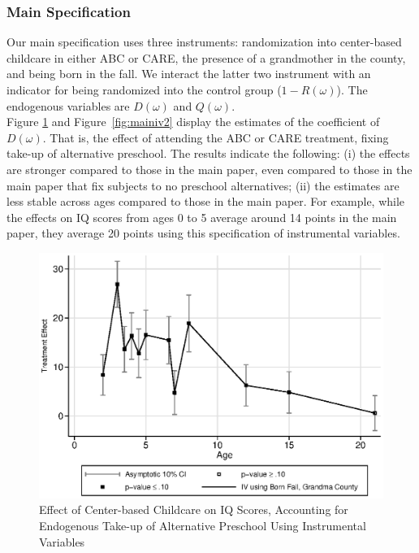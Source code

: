 \begin{appendices}
\subsubsection{Main Specification}

\noindent Our main specification uses three instruments: randomization into center-based childcare in either ABC or CARE, the presence of a grandmother in the county, and being born in the fall. We interact the latter two instrument with an indicator for being randomized into the control group ($1-R(\omega)$). The endogenous variables are $D(\omega)$ and $Q(\omega)$.\\

\noindent Figure \ref{fig:main_iv1} and Figure~\ref{fig:mainiv2} display the estimates of the coefficient of $D(\omega)$. That is, the effect of attending the ABC or CARE treatment, fixing take-up of alternative preschool. The results indicate the following: (i) the effects are stronger compared to those in the main paper, even compared to those in the main paper that fix subjects to no preschool alternatives; (ii) the estimates are less stable across ages compared to those in the main paper. For example, while the effects on IQ scores from ages 0 to 5 average around 14 points in the main paper, they average 20 points using this specification of instrumental variables. 

\begin{figure}[H]
		\caption{Effect of Center-based Childcare on IQ Scores, Accounting for Endogenous Take-up of Alternative Preschool Using Instrumental Variables} \label{fig:main_iv1}
		\includegraphics[width=.7\columnwidth]{output/appendixplots/main_iv_te.eps}
\end{figure}


\end{appendices}
